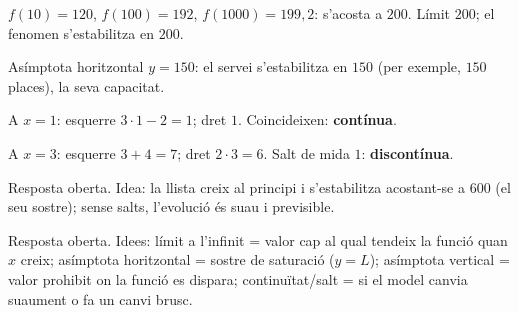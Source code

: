 \begin{solucions}
\begin{sollist}
  \item $f(10)=120$, $f(100)=192$, $f(1000)=199,2$: s'acosta a $200$. Límit $200$; el
        fenomen s'estabilitza en $200$.
  \item Asímptota horitzontal $y=150$: el servei s'estabilitza en $150$ (per exemple,
        $150$ places), la seva capacitat.
  \item A $x=1$: esquerre $3\cdot 1-2=1$; dret $1$. Coincideixen: \textbf{contínua}.
  \item A $x=3$: esquerre $3+4=7$; dret $2\cdot 3=6$. Salt de mida $1$:
        \textbf{discontínua}.
  \item Resposta oberta. Idea: la llista creix al principi i s'estabilitza acostant-se a
        $600$ (el seu sostre); sense salts, l'evolució és suau i previsible.
  \item Resposta oberta. Idees: límit a l'infinit = valor cap al qual tendeix la funció
        quan $x$ creix; asímptota horitzontal = sostre de saturació ($y=L$); asímptota
        vertical = valor prohibit on la funció es dispara; continuïtat/salt = si el
        model canvia suaument o fa un canvi brusc.
\end{sollist}
\end{solucions}
